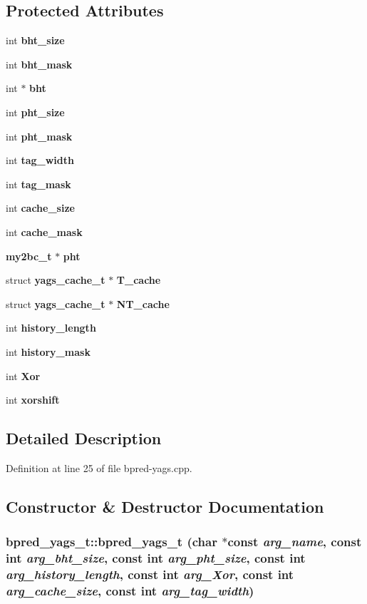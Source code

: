 \subsection*{Protected Attributes}
\begin{CompactItemize}
\item 
int {\bf bht\_\-size}
\item 
int {\bf bht\_\-mask}
\item 
int $\ast$ {\bf bht}
\item 
int {\bf pht\_\-size}
\item 
int {\bf pht\_\-mask}
\item 
int {\bf tag\_\-width}
\item 
int {\bf tag\_\-mask}
\item 
int {\bf cache\_\-size}
\item 
int {\bf cache\_\-mask}
\item 
{\bf my2bc\_\-t} $\ast$ {\bf pht}
\item 
struct {\bf yags\_\-cache\_\-t} $\ast$ {\bf T\_\-cache}
\item 
struct {\bf yags\_\-cache\_\-t} $\ast$ {\bf NT\_\-cache}
\item 
int {\bf history\_\-length}
\item 
int {\bf history\_\-mask}
\item 
int {\bf Xor}
\item 
int {\bf xorshift}
\end{CompactItemize}


\subsection{Detailed Description}


Definition at line 25 of file bpred-yags.cpp.

\subsection{Constructor \& Destructor Documentation}
\subsubsection[{bpred\_\-yags\_\-t}]{\setlength{\rightskip}{0pt plus 5cm}bpred\_\-yags\_\-t::bpred\_\-yags\_\-t (char $\ast$const  {\em arg\_\-name}, \/  const int {\em arg\_\-bht\_\-size}, \/  const int {\em arg\_\-pht\_\-size}, \/  const int {\em arg\_\-history\_\-length}, \/  const int {\em arg\_\-Xor}, \/  const int {\em arg\_\-cache\_\-size}, \/  const int {\em arg\_\-tag\_\-width})\hspace{0.3cm}{\tt  [inline]}}\label{classbpred__yags__t_58936d15e38964226dbf5160cde77bc4}




